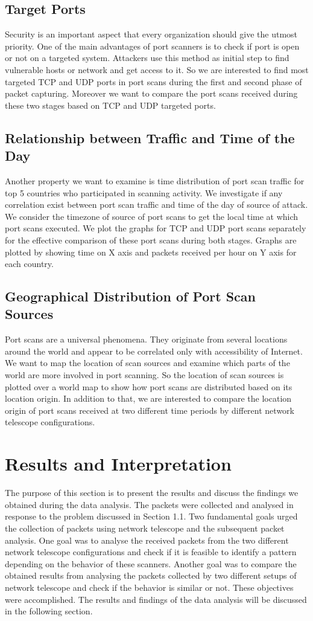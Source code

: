 \subsection{Target Ports}
Security is an important aspect that every organization should give the utmost priority.
One of the main advantages of port scanners is to check if port is open or not on a targeted system.
Attackers use this method as initial step to find vulnerable hosts or network and get access to it.
So we are interested to find most targeted TCP and UDP ports in port scans during the first and second phase of packet capturing.
Moreover we want to compare the port scans received during these two stages based on TCP and UDP targeted ports. 
\subsection{Relationship between Traffic and Time of the Day}
Another property we want to examine is time distribution of port scan traffic for top 5 countries who participated in scanning activity.
We investigate if any correlation exist between port scan traffic and time of the day of source of attack.
We consider the timezone of source of port scans to get the local time at which port scans executed. 
We plot the graphs for TCP and UDP port scans separately for the effective comparison of these port scans during both stages.
Graphs are plotted by showing time on X axis and packets received per hour on Y axis for each country.
\subsection{Geographical Distribution of Port Scan Sources} 
Port scans are a universal phenomena. 
They originate from several locations around the world and appear to be correlated only with accessibility of Internet.
We want to map the location of scan sources and examine which parts of the world are more involved in port scanning.
So the location of scan sources is plotted over a world map to show how port scans are distributed based on its location origin.
In addition to that, we are interested to compare the location origin of port scans received at two different time periods by different network telescope configurations.
\section{Results and Interpretation}
The purpose of this section is to present the results and discuss the findings we obtained during the data analysis.
The packets were collected and analysed in response to the problem discussed in Section 1.1.
Two fundamental goals urged the collection of packets using network telescope and the subsequent packet analysis.
One goal was to analyse the received packets from the two different network telescope configurations and check if it is feasible to identify a pattern depending on the behavior of these scanners.
Another goal was to compare the obtained results from analysing the packets collected by two different setups of network telescope and check if the behavior is similar or not.
These objectives were accomplished.
The results and findings of the data analysis will be discussed in the following section.
